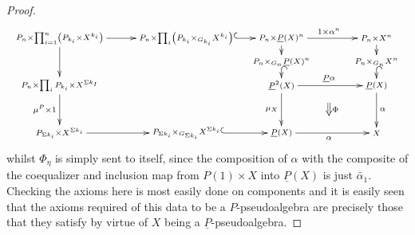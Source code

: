\begin{proof}
	\[
		\xy
			(-10,0)*+{\scriptstyle P_n \times \prod_{i=1}^n\left(P_{k_i} \times X^{k_i}\right)}="00";
           	(30,0)*+{\scriptstyle P_n \times \prod_i \left( P_{k_i} \times_{G_{k_i}} X^{k_i} \right)}="10";
            (60,0)*+{\scriptstyle P_n \times \underline{P}(X)^n}="20";
            (90,0)*+{\scriptstyle P_n \times X^n}="30";
            (-10,-15)*+{\scriptstyle P_n \times \prod_{i} P_{k_i} \times X^{\Sigma k_I}}="01";
            (-10,-30)*+{\scriptstyle P_{\Sigma k_i} \times X^{\Sigma k_{i}}}="02";
            (60,-7.5)*+{\scriptstyle P_n \times_{G_n} \underline{P}(X)^n}="21";
            (60,-15)*+{\scriptstyle \underline{P}^2(X)}="22";
            (90,-7.5)*+{\scriptstyle P_n \times_{G_n} X^n}="31";
            (90,-15)*+{\scriptstyle \underline{P}(X)}="32";
            (30,-30)*+{\scriptstyle P_{\Sigma k_i} \times_{G_{\Sigma k_i}} X^{\Sigma k_i}}="12";
            (60,-30)*+{\scriptstyle \underline{P}(X)}="23";
            (90,-30)*+{\scriptstyle X}="33";
            {\ar "00" ; "10"};
            {\ar "00" ; "01"};
            {\ar_{\mu^P \times 1} "01" ; "02"};
            {\ar@{^{(}->} "10" ; "20"};
            {\ar "20" ; "21"};
            {\ar^{1 \times \alpha^n} "20" ; "30"};
            {\ar "30" ; "31"};
            {\ar@{^{(}->} "21" ; "22"};
            {\ar^{\underline{P}\alpha} "22" ; "32"};
            {\ar@{^{(}->} "31" ; "32"};
            {\ar_{\mu_X} "22" ; "23"};
            {\ar_{\alpha} "23" ; "33"};
            {\ar^{\alpha} "32" ; "33"};
            {\ar "02" ; "12"};
            {\ar@{^{(}->} "12" ; "23"};
            {\ar@{=>}^{\Phi} (75,-20.5) ; (75,-24.5)};
        \endxy
    \]
whilst $\Phi_\eta$ is simply sent to itself, since the composition of $\alpha$ with the composite of the coequalizer and inclusion map from $P(1) \times X$ into $\underline{P}(X)$ is just $\tilde{\alpha_1}$. Checking the axioms here is most easily done on components and it is easily seen that the axioms required of this data to be a $P$-pseudoalgebra are precisely those that they satisfy by virtue of $X$ being  a $\underline{P}$-pseudoalgebra.


\end{proof}
